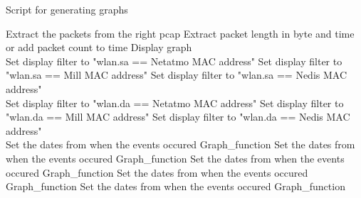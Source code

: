\begin{algorithm}
\caption{Script for generating graphs}\label{alg:GraphScript}
\begin{algorithmic}[1]
         
            \State Extract the packets from the right pcap
                \State Extract packet length in byte and time or add packet count to time
                \State Display graph
            \EndFor
        \EndFor {}\\
     
            \State Set display filter to "wlan.sa == Netatmo MAC address"
            \State Set display filter to "wlan.sa == Mill MAC address"
            \State Set display filter to "wlan.sa == Nedis MAC address"    
        \EndIf\\
     
            \State Set display filter to "wlan.da == Netatmo MAC address"
            \State Set display filter to "wlan.da == Mill MAC address"
            \State Set display filter to "wlan.da == Nedis MAC address"  
        \EndIf\\
     
        \State Set the dates from when the events occured 
        \State Graph\_function
        \State Set the dates from when the events occured 
        \State Graph\_function
        \State Set the dates from when the events occured 
        \State Graph\_function
        \State Set the dates from when the events occured 
        \State Graph\_function
        \State Set the dates from when the events occured 
        \State Graph\_function
    \EndIf {}
\end{algorithmic}
\end{algorithm}

